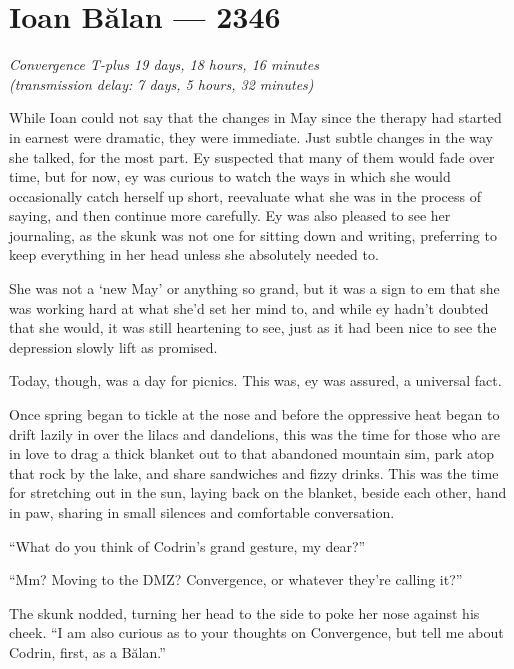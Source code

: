 \hypertarget{ioan-bux103lan-2346}{%
\chapter{Ioan Bălan — 2346}\label{ioan-bux103lan-2346}}

\begin{center}
\emph{Convergence T-plus 19 days, 18 hours, 16 minutes}\\
\emph{(transmission delay: 7 days, 5 hours, 32 minutes)}
\end{center}

\noindent While Ioan could not say that the changes in May since the therapy had started in earnest were dramatic, they were immediate. Just subtle changes in the way she talked, for the most part. Ey suspected that many of them would fade over time, but for now, ey was curious to watch the ways in which she would occasionally catch herself up short, reevaluate what she was in the process of saying, and then continue more carefully. Ey was also pleased to see her journaling, as the skunk was not one for sitting down and writing, preferring to keep everything in her head unless she absolutely needed to.

She was not a `new May' or anything so grand, but it was a sign to em that she was working hard at what she'd set her mind to, and while ey hadn't doubted that she would, it was still heartening to see, just as it had been nice to see the depression slowly lift as promised.

Today, though, was a day for picnics. This was, ey was assured, a universal fact.

Once spring began to tickle at the nose and before the oppressive heat began to drift lazily in over the lilacs and dandelions, this was the time for those who are in love to drag a thick blanket out to that abandoned mountain sim, park atop that rock by the lake, and share sandwiches and fizzy drinks. This was the time for stretching out in the sun, laying back on the blanket, beside each other, hand in paw, sharing in small silences and comfortable conversation.

``What do you think of Codrin's grand gesture, my dear?''

``Mm? Moving to the DMZ? Convergence, or whatever they're calling it?''

The skunk nodded, turning her head to the side to poke her nose against his cheek. ``I am also curious as to your thoughts on Convergence, but tell me about Codrin, first, as a Bălan.''

